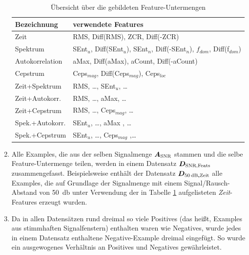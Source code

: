 \begin{enumerate}
\begin{table}[h]
\centering
\caption{Übersicht über die gebildeten Feature-Untermengen}
\label{tab:vad_feat_subsets}
\begin{tabular}{@{}ll@{}}
\toprule
Bezeichnung & verwendete Features                                                              \\ \midrule
Zeit                     & RMS, Diff(RMS), ZCR, Diff(-ZCR)                                                  \\
Spektrum                 & SEnt$_u$, Diff(SEnt$_u$), SEnt$_n$, Diff(-SEnt$_n$), $f_{dom}$, Diff(f$_{dom}$) \\
Autokorrelation          & aMax, Diff(aMax), aCount, Diff(-aCount)                                          \\
Cepstrum                 & Ceps$_{mag}$, Diff(Ceps$_{mag}$), Ceps$_{loc}$                                   \\
Zeit+Spektrum            & RMS, \ldots , SEnt$_u$, \ldots                                                   \\
Zeit+Autokorr.           & RMS, \ldots , aMax, \ldots                                                       \\
Zeit+Cepstrum            & RMS, \ldots , Ceps$_{mag}$, \ldots                                               \\
Spek.+Autokorr.          & SEnt$_u$, \ldots , aMax , \ldots                                                 \\
Spek.+Cepstrum           & SEnt$_u$, \ldots, Ceps$_{mag}$ ,\ldots                                           \\ \bottomrule
\end{tabular}
\end{table}

\item Alle Examples, die aus der selben Signalmenge $\boldmath{A_{\text{SNR}}}$ stammen und die selbe Feature-Untermenge teilen, werden in einem Datensatz $\boldmath{D_{\text{SNR,Feats}}}$ zusammengefasst. Beispielsweise enthält der Datensatz $\boldmath{D_{\SI{50}{\decibel},\text{Zeit}}}$ alle Examples, die auf Grundlage der Signalmenge mit einem Signal/Rausch-Abstand von \SI{50}{\decibel} unter Verwendung der in Tabelle \ref{tab:vad_feat_subsets} aufgelisteten \emph{Zeit}-Features erzeugt wurden.
\item Da in allen Datensätzen rund dreimal so viele Positives (das heißt, Examples aus stimmhaften Signalfenstern) enthalten waren wie Negatives, wurde jedes in einem Datensatz enthaltene Negative-Example dreimal eingefügt. So wurde ein ausgewogenes Verhältnis an Positives und Negatives gewährleistet.
\end{enumerate}

